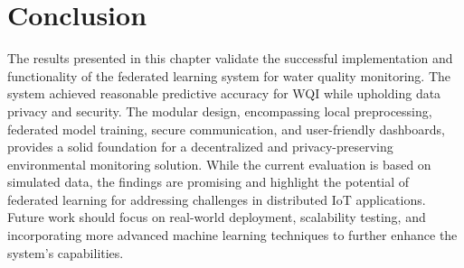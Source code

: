 \section*{Conclusion}
The results presented in this chapter validate the successful implementation and functionality of the federated learning system for water quality monitoring. The system achieved reasonable predictive accuracy for WQI while upholding data privacy and security. The modular design, encompassing local preprocessing, federated model training, secure communication, and user-friendly dashboards, provides a solid foundation for a decentralized and privacy-preserving environmental monitoring solution. While the current evaluation is based on simulated data, the findings are promising and highlight the potential of federated learning for addressing challenges in distributed IoT applications. Future work should focus on real-world deployment, scalability testing, and incorporating more advanced machine learning techniques to further enhance the system's capabilities.





